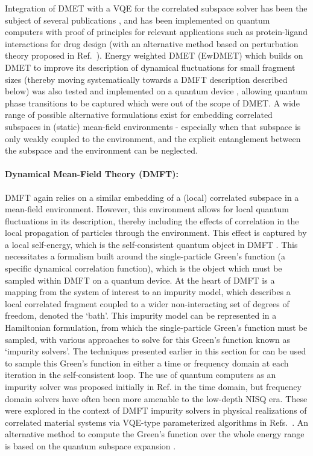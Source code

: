 Integration of DMET with a VQE for the correlated subspace solver has been the subject of several publications \cite{Rubin2016, Yamazaki2018, Ma2020, Mineh2021, Li2021}, and has been implemented on quantum computers with proof of principles for relevant applications such as protein-ligand interactions for drug design \cite{Kirsopp2021} (with an alternative method based on perturbation theory proposed in Ref.~\cite{Malone2021}). Energy weighted DMET (EwDMET) which builds on DMET to improve its description of dynamical fluctuations for small fragment sizes (thereby moving systematically towards a DMFT description described below) \cite{Fertitta2018, Fertitta2019, Sriluckshmy2021} was also tested and implemented on a quantum device \cite{Tilly2021}, allowing quantum phase transitions to be captured which were out of the scope of DMET. A wide range of possible alternative formulations exist for embedding correlated subspaces in (static) mean-field environments - especially when that subspace is only weakly coupled to the environment, and the explicit entanglement between the subspace and the environment can be neglected.

\paragraph{Dynamical Mean-Field Theory (DMFT):} DMFT again relies on a similar embedding of a (local) correlated subspace in a mean-field environment. However, this environment allows for local quantum fluctuations in its description, thereby including the effects of correlation in the local propagation of particles through the environment. This effect is captured by a local self-energy, which is the self-consistent quantum object in DMFT \cite{Georges1996}. This necessitates a formalism built around the single-particle Green's function (a specific dynamical correlation function), which is the object which must be sampled within DMFT on a quantum device. At the heart of DMFT is a mapping from the system of interest to an impurity model, which describes a local correlated fragment coupled to a wider non-interacting set of degrees of freedom, denoted the `bath'. This impurity model can be represented in a Hamiltonian formulation, from which the single-particle Green's function must be sampled, with various approaches to solve for this Green's function known as `impurity solvers'. The techniques presented earlier in this section for can be used to sample this Green's function in either a time or frequency domain at each iteration in the self-consistent loop. 
The use of quantum computers as an impurity solver was proposed initially in Ref. \cite{Bauer2016} in the time domain, but frequency domain solvers have often been more amenable to the low-depth NISQ era. These were explored in the context of DMFT impurity solvers in physical realizations of correlated material systems via VQE-type parameterized algorithms in Refs.~\cite{Endo2019GF,runggerDynamicalMeanField2020, Kreula2016,Jamet2021}. An alternative method to compute the Green's function over the whole energy range is based on the quantum subspace expansion \cite{Jamet2022}.


